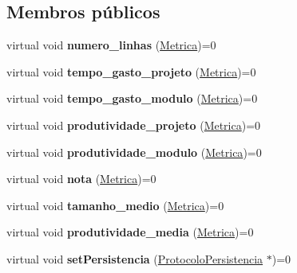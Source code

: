 \subsection*{\-Membros públicos}
\begin{DoxyCompactItemize}
\item 
\hypertarget{class_protocolo_metrica_a25f884c5349e9791d8f482c70e5758e5}{
virtual void {\bfseries numero\-\_\-linhas} (\hyperlink{class_metrica}{\-Metrica})=0}
\label{class_protocolo_metrica_a25f884c5349e9791d8f482c70e5758e5}

\item 
\hypertarget{class_protocolo_metrica_ac79ddc9645f304b502beb9bcac0c02d4}{
virtual void {\bfseries tempo\-\_\-gasto\-\_\-projeto} (\hyperlink{class_metrica}{\-Metrica})=0}
\label{class_protocolo_metrica_ac79ddc9645f304b502beb9bcac0c02d4}

\item 
\hypertarget{class_protocolo_metrica_ace1e8a26124c509054786c482cfecb8b}{
virtual void {\bfseries tempo\-\_\-gasto\-\_\-modulo} (\hyperlink{class_metrica}{\-Metrica})=0}
\label{class_protocolo_metrica_ace1e8a26124c509054786c482cfecb8b}

\item 
\hypertarget{class_protocolo_metrica_a1180e2c970d5e853d125e30c77fe1f0e}{
virtual void {\bfseries produtividade\-\_\-projeto} (\hyperlink{class_metrica}{\-Metrica})=0}
\label{class_protocolo_metrica_a1180e2c970d5e853d125e30c77fe1f0e}

\item 
\hypertarget{class_protocolo_metrica_a430351b35ef34d8ae90ea4d517af20be}{
virtual void {\bfseries produtividade\-\_\-modulo} (\hyperlink{class_metrica}{\-Metrica})=0}
\label{class_protocolo_metrica_a430351b35ef34d8ae90ea4d517af20be}

\item 
\hypertarget{class_protocolo_metrica_ab9cd9abb8cf1d6fcc65e271547267e9e}{
virtual void {\bfseries nota} (\hyperlink{class_metrica}{\-Metrica})=0}
\label{class_protocolo_metrica_ab9cd9abb8cf1d6fcc65e271547267e9e}

\item 
\hypertarget{class_protocolo_metrica_a27ce5bf3ade36e0af9624b5b59043eb2}{
virtual void {\bfseries tamanho\-\_\-medio} (\hyperlink{class_metrica}{\-Metrica})=0}
\label{class_protocolo_metrica_a27ce5bf3ade36e0af9624b5b59043eb2}

\item 
\hypertarget{class_protocolo_metrica_a6125a4e8a938b95f39e7901bd1e2a275}{
virtual void {\bfseries produtividade\-\_\-media} (\hyperlink{class_metrica}{\-Metrica})=0}
\label{class_protocolo_metrica_a6125a4e8a938b95f39e7901bd1e2a275}

\item 
\hypertarget{class_protocolo_metrica_a8d46750f979501d8e5b8e21a2eae09bb}{
virtual void {\bfseries set\-Persistencia} (\hyperlink{class_protocolo_persistencia}{\-Protocolo\-Persistencia} $\ast$)=0}
\label{class_protocolo_metrica_a8d46750f979501d8e5b8e21a2eae09bb}

\end{DoxyCompactItemize}


